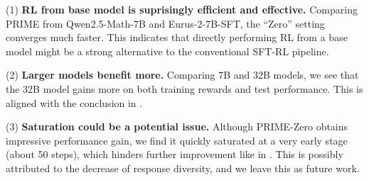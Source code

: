 (1) \textbf{RL from base model is suprisingly efficient and effective.} Comparing PRIME from Qwen2.5-Math-7B and Eurus-2-7B-SFT, the ``Zero'' setting converges much faster. This indicates that directly performing RL from a base model might be a strong alternative to the conventional SFT-RL pipeline.

(2) \textbf{Larger models benefit more.} Comparing 7B and 32B models, we see that the 32B model gains more on both training rewards and test performance. This is aligned with the conclusion in \citet{deepseekai2025deepseekr1incentivizingreasoningcapability}.

(3) \textbf{Saturation could be a potential issue.} Although PRIME-Zero obtains impressive performance gain, we find it quickly saturated at a very early stage (about 50 steps), which hinders further improvement like in \citet{deepseekai2025deepseekr1incentivizingreasoningcapability}. This is possibly attributed to the decrease of response diversity, and we leave this as future work.


